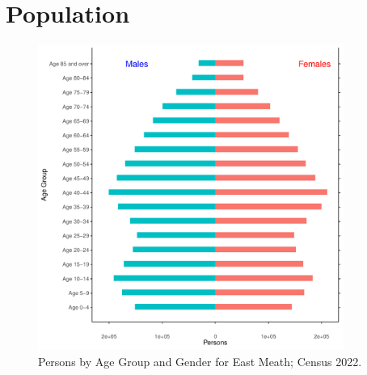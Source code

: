 \documentclass{article}
\begin{document}
\pagebreak

\section{Population} 
\label{sect:Pop}

\begin{figure}[h]
	\centering
	\includegraphics[width = 100mm]{../figures/PyramidPlot.pdf}
	\caption{Persons by Age Group and Gender for East Meath; Census 2022.}
	\label{fig:2ae19629-1a6a-13a3-e055-000000000001}
	\end{figure}
\end{document}
